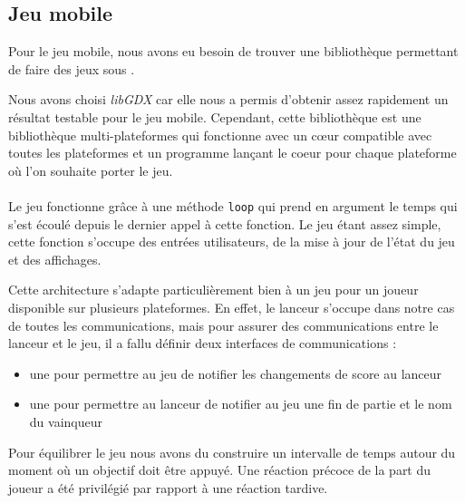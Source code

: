 \subsection{Jeu mobile}
Pour le jeu mobile, nous avons eu besoin de trouver une bibliothèque permettant de faire des jeux sous \android{}.

Nous avons choisi \textit{libGDX} car elle nous a permis d'obtenir assez rapidement un résultat testable pour le jeu mobile. Cependant, cette bibliothèque est une bibliothèque multi-plateformes qui fonctionne avec un c\oe{}ur compatible avec toutes les plateformes et un programme lançant le coeur pour chaque plateforme où l'on souhaite porter le jeu.

\paragraph{}
Le jeu fonctionne grâce à une méthode \verb!loop! qui prend en argument le temps qui s'est écoulé depuis le dernier appel à cette fonction. Le jeu étant assez simple, cette fonction s'occupe des entrées utilisateurs, de la mise à jour de l'état du jeu et des affichages.

Cette architecture s'adapte particulièrement bien à un jeu pour un joueur disponible sur plusieurs plateformes. En effet, le lanceur \android{} s'occupe dans notre cas de toutes les communications, mais pour assurer des communications entre le lanceur et le jeu, il a fallu définir deux interfaces de communications :
\begin{itemize}
\item une pour permettre au jeu de notifier les changements de score au lanceur
\item une pour permettre au lanceur de notifier au jeu une fin de partie et le nom du vainqueur
\end{itemize}

Pour équilibrer le jeu nous avons du construire un intervalle de temps autour du moment où un objectif doit être appuyé. Une réaction précoce de la part du joueur a été privilégié par rapport à une réaction tardive.

